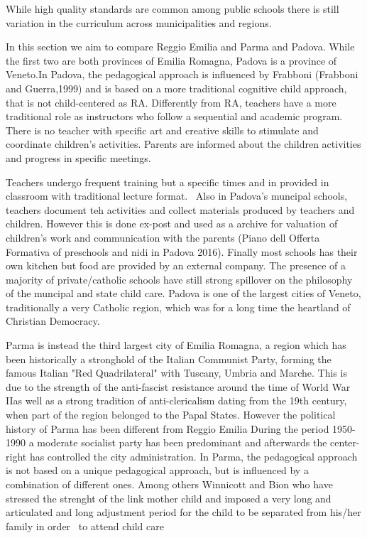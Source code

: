 \documentclass[12pt]{article}
\begin{document}
While high quality standards are common among public schools there is still
variation in the curriculum across municipalities and regions.

In this section we aim to compare Reggio Emilia and Parma and Padova. While
the first two are both provinces of Emilia Romagna, Padova is a province of
Veneto.In Padova, the pedagogical approach is influenced by Frabboni
(Frabboni and Guerra,1999) and is based on a more traditional cognitive
child approach, that is not child-centered as RA. Differently from RA,
teachers have a more traditional role as instructors who follow a sequential
and academic program. There is no teacher with specific art and creative
skills to stimulate and coordinate children's activities. Parents are
informed about the children activities and progress in specific meetings.

Teachers undergo frequent training but a specific times and in provided in
classroom with traditional lecture format. \ Also in Padova's muncipal
schools, teachers document teh activities and collect materials produced by
teachers and children. However this is done ex-post and used as a archive
for valuation of children's work and communication with the parents (Piano
dell Offerta Formativa of preschools and nidi in Padova 2016). Finally most
schools has their own kitchen but food are provided by an external company.
The presence of a majority of private/catholic schools have still strong
spillover on the philosophy of the muncipal and state child care. Padova is
one of the largest cities of Veneto, traditionally a very Catholic region,
which was for a long time the heartland of Christian Democracy.

Parma is instead the third largest city of Emilia Romagna, a region which
has been historically a stronghold of the Italian Communist Party, forming
the famous Italian "Red Quadrilateral" with Tuscany, Umbria and Marche. This
is due to the strength of the anti-fascist resistance around the time of
World War IIas well as a strong tradition of anti-clericalism dating from
the 19th century, when part of the region belonged to the Papal States.
However the political history of Parma has been different from Reggio Emilia
During the period 1950-1990 a moderate socialist party has been predominant
and  afterwards the center-right has controlled the city administration. In
Parma, the pedagogical approach is not based on a unique pedagogical
approach, but is influenced by a combination of different ones. Among others
Winnicott and Bion who have stressed the strenght of the link mother child
and imposed a very long and articulated and long adjustment period for the
child to be separated from his/her family in order \ to attend child care
\end{document}
